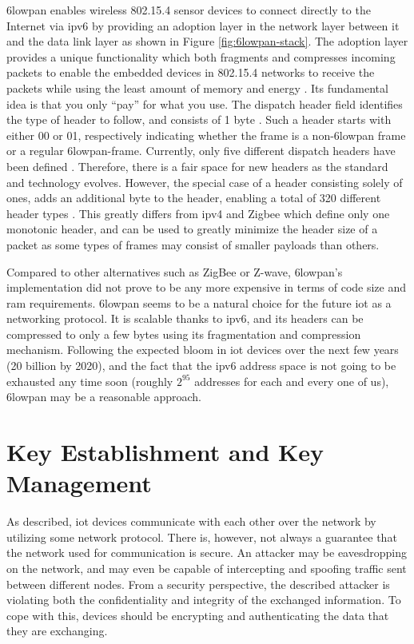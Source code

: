 \gls{6lowpan} enables wireless 802.15.4 sensor devices to connect directly to the Internet via \gls{ip}v6 by providing an adoption layer in the network layer between it and the data link layer as shown in Figure \ref{fig:6lowpan-stack}. The adoption layer provides a unique functionality which both fragments and compresses incoming packets to enable the embedded devices in 802.15.4 networks to receive the packets while using the least amount of memory and energy \cite{krentz20136lowpan}. Its fundamental idea is that you only ``pay'' for what you use. The dispatch header field identifies the type of header to follow, and consists of 1 byte \citep{Mulligan2007}. Such a header starts with either 00 or 01, respectively indicating whether the frame is a non-\gls{6lowpan} frame or a regular \gls{6lowpan}-frame. Currently, only five different dispatch headers have been defined \cite{rfc6282}. Therefore, there is a fair space for new headers as the standard and technology evolves. However, the special case of a header consisting solely of ones, adds an additional byte to the header, enabling a total of 320 different header types \citep{Mulligan2007}. This greatly differs from \gls{ip}v4 and Zigbee which define only one monotonic header, and can be used to greatly minimize the header size of a packet as some types of frames may consist of smaller payloads than others.


Compared to other alternatives such as ZigBee or Z-wave, \gls{6lowpan}'s implementation did not prove to be any more expensive in terms of code size and \gls{ram} requirements. \gls{6lowpan} seems to be a natural choice for the future \gls{iot} as a networking protocol. It is scalable thanks to \gls{ip}v6, and its headers can be compressed to only a few bytes using its fragmentation and compression mechanism. Following the expected bloom in \gls{iot} devices over the next few years (20 billion by 2020), and the fact that the \gls{ip}v6 address space is not going to be exhausted any time soon (roughly $2^{95}$ addresses for each and every one of us), \gls{6lowpan} may be a reasonable approach.

\section{Key Establishment and Key Management}
\label{sec:keyestablishment}

As described, \gls{iot} devices communicate with each other over the network by utilizing some network protocol. There is, however, not always a guarantee that the network used for communication is secure. An attacker may be eavesdropping on the network, and may even be capable of intercepting and spoofing traffic sent between different nodes. From a security perspective, the described attacker is violating both the confidentiality and integrity of the exchanged information. To cope with this, devices should be encrypting and authenticating the data that they are exchanging. 


